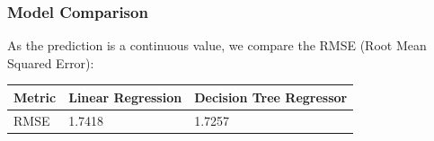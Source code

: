 \documentclass{article}
\begin{document}
\subsubsection{Model Comparison}
    As the prediction is a continuous value, we compare the RMSE (Root Mean Squared Error):
    \begin{table}[h]
        \begin{center}
            \begin{tabular}{|l|l|l|}
                \hline
                Metric &Linear Regression &Decision Tree Regressor \\
                \hline
                RMSE &1.7418 &1.7257 \\
                \hline
            \end{tabular}
        \end{center}
    \end{table}
\end{document}
